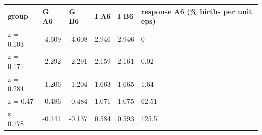\begingroup\small
\setlength{\tabcolsep}{3pt}
\renewcommand{\arraystretch}{1.04}
\begin{tabularx}{\linewidth}{XXXXXX}
\toprule
group & G A6 & G B6 & I A6 & I B6 & response A6 (\% births per unit eps) \\
\midrule
z = 0.103 & -4.609 & -4.608 & 2.946 & 2.946 & 0 \\
z = 0.171 & -2.292 & -2.291 & 2.159 & 2.161 & 0.02 \\
z = 0.284 & -1.206 & -1.204 & 1.663 & 1.665 & 1.64 \\
z = 0.47 & -0.486 & -0.484 & 1.071 & 1.075 & 62.51 \\
z = 0.778 & -0.141 & -0.137 & 0.584 & 0.593 & 125.5 \\
\bottomrule
\end{tabularx}
\endgroup
